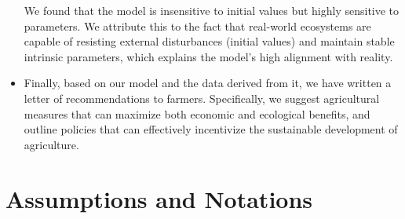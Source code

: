 \documentclass{HZNUMCM}
\begin{document}
\begin{itemize}
      We found that the model is insensitive to initial values but highly sensitive to parameters. 
      We attribute this to the fact that real-world ecosystems are capable of resisting external disturbances (initial values) and maintain stable intrinsic parameters, 
      which explains the model's high alignment with reality.
      \item Finally, based on our model and the data derived from it, we have written a letter of recommendations to farmers. 
      Specifically, we suggest agricultural measures that can maximize both economic and ecological benefits, 
      and outline policies that can effectively incentivize the sustainable development of agriculture.
    \end{itemize}
  \section{Assumptions and Notations}
\end{document}

